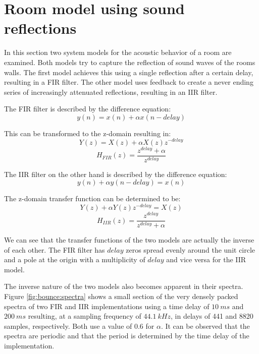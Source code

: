 \documentclass[journal]{IEEEtran}
\begin{document}
\newpage

\section{Room model using sound reflections}

In this section two system models for the acoustic behavior of a room are examined. Both models try to capture the reflection of sound waves of the rooms walls. The first model achieves this using a single reflection after a certain delay, resulting in a FIR filter. The other model uses feedback to create a never ending series of increasingly attenuated reflections, resulting in an IIR filter.

The FIR filter is described by the difference equation:
\begin{equation}
    y(n) = x(n) + \alpha x(n-delay)
\end{equation}

This can be transformed to the z-domain resulting in:
 \begin{equation}
     Y(z) = X(z) + \alpha X(z) z^{-delay}
 \end{equation}
 \begin{equation}
     H_{FIR}(z) = \frac{z^{delay} + \alpha}{z^{delay}}
\end{equation}

The IIR filter on the other hand is described by the difference equation:
\begin{equation}
    y(n) + \alpha y(n-delay) = x(n)
\end{equation}

The z-domain transfer function can be determined to be:
\begin{equation}
    Y(z) + \alpha Y(z) z^{-delay} = X(z)
\end{equation}
\begin{equation}
    H_{IIR}(z) = \frac{z^{delay}}{z^{delay} + \alpha}
\end{equation}

We can see that the transfer functions of the two models are actually the inverse of each other. The FIR filter has $delay$ zeros spread evenly around the unit circle and a pole at the origin with a multiplicity of $delay$ and vice versa for the IIR model.

The inverse nature of the two models also becomes apparent in their spectra. Figure \ref{fig:bounce:spectra} shows a small section of the very densely packed spectra of two FIR and IIR implementations using a time delay of $\SI{10}{ms}$ and $\SI{200}{ms}$ resulting,  at a sampling frequency of $\SI{44.1}{kHz}$, in delays of 441 and 8820 samples, respectively. Both use a value of 0.6 for $\alpha$. It can be observed that the spectra are periodic and that the period is determined by the time delay of the implementation.
\end{document}
